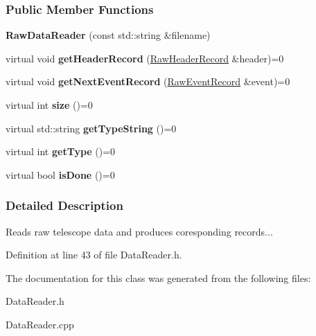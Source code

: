 \subsubsection*{Public Member Functions}
\begin{DoxyCompactItemize}
\item 
\hypertarget{classRawDataReader_a4cf4dcf435e86abd1792be937084d18c}{
{\bfseries RawDataReader} (const std::string \&filename)}
\label{classRawDataReader_a4cf4dcf435e86abd1792be937084d18c}

\item 
\hypertarget{classRawDataReader_aac3ec4c174cb05a97849a1dac8f97571}{
virtual void {\bfseries getHeaderRecord} (\hyperlink{structRawHeaderRecord}{RawHeaderRecord} \&header)=0}
\label{classRawDataReader_aac3ec4c174cb05a97849a1dac8f97571}

\item 
\hypertarget{classRawDataReader_a5d9485d27fba9078f1f4634e1d2349fb}{
virtual void {\bfseries getNextEventRecord} (\hyperlink{structRawEventRecord}{RawEventRecord} \&event)=0}
\label{classRawDataReader_a5d9485d27fba9078f1f4634e1d2349fb}

\item 
\hypertarget{classRawDataReader_a25df0c9abfdfde177c91b0773b4a53c5}{
virtual int {\bfseries size} ()=0}
\label{classRawDataReader_a25df0c9abfdfde177c91b0773b4a53c5}

\item 
\hypertarget{classRawDataReader_ae18f632cbec6ad6267b94da724939700}{
virtual std::string {\bfseries getTypeString} ()=0}
\label{classRawDataReader_ae18f632cbec6ad6267b94da724939700}

\item 
\hypertarget{classRawDataReader_a46d9e42a28ea4cebd6172a87a4e36099}{
virtual int {\bfseries getType} ()=0}
\label{classRawDataReader_a46d9e42a28ea4cebd6172a87a4e36099}

\item 
\hypertarget{classRawDataReader_a203fd47e0b6f43801ccd5de962f24c71}{
virtual bool {\bfseries isDone} ()=0}
\label{classRawDataReader_a203fd47e0b6f43801ccd5de962f24c71}

\end{DoxyCompactItemize}


\subsubsection{Detailed Description}
Reads raw telescope data and produces coresponding records... 

Definition at line 43 of file DataReader.h.



The documentation for this class was generated from the following files:\begin{DoxyCompactItemize}
\item 
DataReader.h\item 
DataReader.cpp\end{DoxyCompactItemize}
